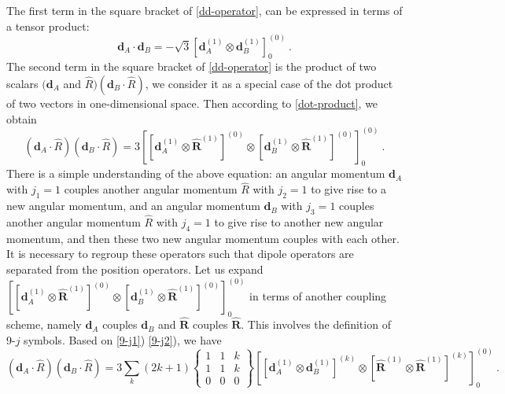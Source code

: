 The first term in the square bracket of \autoref{dd-operator}, can be expressed in terms of a tensor product:
\begin{equation}
\mathbf{d}_{A}\cdot\mathbf{d}_{B} = - \sqrt{3} \left[ \mathbf{d}_{A}^{(1)} \otimes \mathbf{d}_{B}^{(1)} \right]_{0}^{(0)} \ . \label{dot-product}
\end{equation}
The second term in the square bracket of \autoref{dd-operator} is the product of two scalars $(\mathbf{d}_{A}$ and $\hat{R})(\mathbf{d}_{B}\cdot\hat{R})$, we consider it as a special case of the dot product of two vectors in one-dimensional space. Then according to \autoref{dot-product}, we obtain
\begin{equation}
(\mathbf{d}_{A}\cdot\hat{R})(\mathbf{d}_{B}\cdot\hat{R})= 3\left[ \left[ \mathbf{d}_{A}^{(1)} \otimes \mathbf{\hat{R}}^{(1)} \right]^{(0)}\otimes \left[ \mathbf{d}_{B}^{(1)} \otimes \mathbf{\hat{R}}^{(1)} \right]^{(0)}  \right]_{0}^{(0)}  \ .
\end{equation}
There is a simple understanding of the above equation: an angular momentum $\mathbf{d}_{A}$ with $j_{1}=1$ couples  another angular momentum $\hat{R}$ with $j_{2}=1$ to give rise to a new angular momentum, and an angular momentum $\mathbf{d}_{B}$ with $j_{3}=1$ couples  another angular momentum $\hat{R}$ with $j_{4}=1$ to give rise to another new angular momentum, and then these two new angular momentum couples with each other. It is necessary to regroup these operators such that dipole operators are separated from the position operators. 
Let us expand $\left[ \left[ \mathbf{d}_{A}^{(1)} \otimes \mathbf{\hat{R}}^{(1)} \right]^{(0)}\otimes \left[ \mathbf{d}_{B}^{(1)} \otimes \mathbf{\hat{R}}^{(1)} \right]^{(0)}  \right]_{0}^{(0)}$ in terms of another coupling scheme, namely $\mathbf{d}_{A}$ couples $\mathbf{d}_{B}$ and $\mathbf{\hat{R}}$ couples $\mathbf{\hat{R}}$. 
This involves the definition of 9-$j$ symbols. Based on \autoref{9-j1}) \autoref{9-j2}), we have
\begin{equation}
(\mathbf{d}_{A}\cdot\hat{R})(\mathbf{d}_{B}\cdot\hat{R})= 3\sum_{k}(2k + 1) 
\left\{
\begin{array}{ccc}
1& 1&k \\
1&1&k \\
0&0&0 
\end{array}
\right\} 
\left[ \left[ \mathbf{d}_{A}^{(1)} \otimes \mathbf{d}_{B}^{(1)} \right]^{(k)}\otimes \left[ \mathbf{\hat{R}}^{(1)} \otimes \mathbf{\hat{R}}^{(1)} \right]^{(k)}  \right]_{0}^{(0)} \ . \label{regrouping}
\end{equation}

